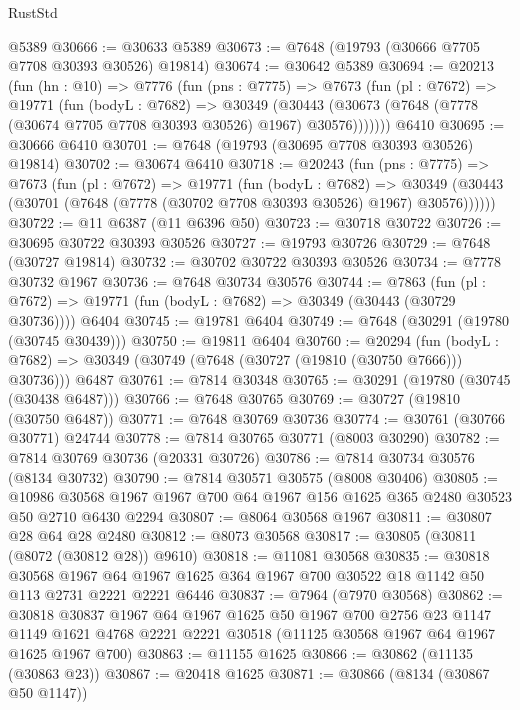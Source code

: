 \begin{lexlean}{RustStd}
\begin{coremodule}
{\begin{coremodule}
{{{{{{{{{{{{{{{{{{{{{{{{{{{{{{{{{{{{{{{{{{{{{{{{{{{{{    @5389
@30666 := @30633 @5389
@30673 := @7648 (@19793 (@30666 @7705 @7708 @30393 @30526) @19814)
@30674 := @30642 @5389
@30694 := @20213
    (fun (hn : @10) =>
    @7776
      (fun (pns : @7775) =>
      @7673
        (fun (pl : @7672) =>
        @19771
          (fun (bodyL : @7682) =>
          @30349
            (@30443 (@30673 (@7648 (@7778 (@30674 @7705 @7708 @30393 @30526) @1967) @30576)))))))
    @6410
@30695 := @30666 @6410
@30701 := @7648 (@19793 (@30695 @7708 @30393 @30526) @19814)
@30702 := @30674 @6410
@30718 := @20243
    (fun (pns : @7775) =>
    @7673
      (fun (pl : @7672) =>
      @19771
        (fun (bodyL : @7682) =>
        @30349 (@30443 (@30701 (@7648 (@7778 (@30702 @7708 @30393 @30526) @1967) @30576))))))
@30722 := @11 @6387 (@11 @6396 @50)
@30723 := @30718 @30722
@30726 := @30695 @30722 @30393 @30526
@30727 := @19793 @30726
@30729 := @7648 (@30727 @19814)
@30732 := @30702 @30722 @30393 @30526
@30734 := @7778 @30732 @1967
@30736 := @7648 @30734 @30576
@30744 := @7863
    (fun (pl : @7672) => @19771 (fun (bodyL : @7682) => @30349 (@30443 (@30729 @30736))))
    @6404
@30745 := @19781 @6404
@30749 := @7648 (@30291 (@19780 (@30745 @30439)))
@30750 := @19811 @6404
@30760 := @20294
    (fun (bodyL : @7682) => @30349 (@30749 (@7648 (@30727 (@19810 (@30750 @7666))) @30736)))
    @6487
@30761 := @7814 @30348
@30765 := @30291 (@19780 (@30745 (@30438 @6487)))
@30766 := @7648 @30765
@30769 := @30727 (@19810 (@30750 @6487))
@30771 := @7648 @30769 @30736
@30774 := @30761 (@30766 @30771) @24744
@30778 := @7814 @30765 @30771 (@8003 @30290)
@30782 := @7814 @30769 @30736 (@20331 @30726)
@30786 := @7814 @30734 @30576 (@8134 @30732)
@30790 := @7814 @30571 @30575 (@8008 @30406)
@30805 := @10986
    @30568
    @1967
    @1967
    @700
    @64
    @1967
    @156
    @1625
    @365
    @2480
    @30523
    @50
    @2710
    @6430
    @2294
@30807 := @8064 @30568 @1967
@30811 := @30807 @28 @64 @28 @2480
@30812 := @8073 @30568
@30817 := @30805 (@30811 (@8072 (@30812 @28)) @9610)
@30818 := @11081 @30568
@30835 := @30818
    @30568
    @1967
    @64
    @1967
    @1625
    @364
    @1967
    @700
    @30522
    @18
    @1142
    @50
    @113
    @2731
    @2221
    @2221
    @6446
@30837 := @7964 (@7970 @30568)
@30862 := @30818
    @30837
    @1967
    @64
    @1967
    @1625
    @50
    @1967
    @700
    @2756
    @23
    @1147
    @1149
    @1621
    @4768
    @2221
    @2221
    @30518
    (@11125 @30568 @1967 @64 @1967 @1625 @1967 @700)
@30863 := @11155 @1625
@30866 := @30862 (@11135 (@30863 @23))
@30867 := @20418 @1625
@30871 := @30866 (@8134 (@30867 @50 @1147))
}}}}}}}}}}}}}}}}}}}}}}}}}}}}}}}}}}}}}}}}}}}}}}}}}}}}}
\end{coremodule}}
\end{coremodule}
\end{lexlean}
